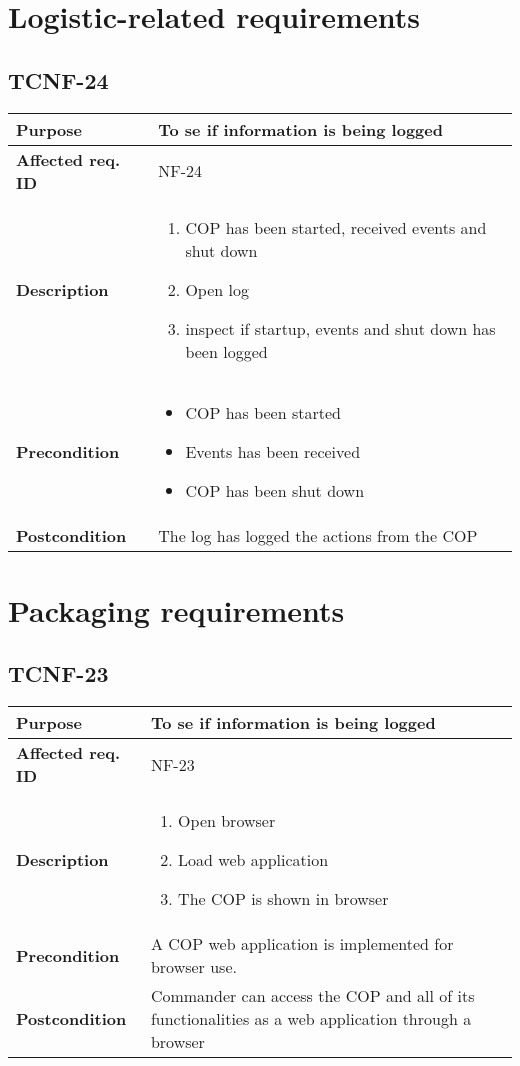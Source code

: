 \section{Logistic-related requirements}
\subsection{TCNF-24}
\begin{tabular}{ l | m{11cm}}
	\textbf{Purpose}			& To se if information is being logged  \\ \hline
	\textbf{Affected req. ID}	& NF-24 \\ \hline
	\textbf{Description}		& \begin{enumerate}
		\item COP has been started, received events and shut down \item Open log \item inspect if startup, events and shut down has been logged
		\end{enumerate}\\
		\hline
	\textbf{Precondition}		& \begin{itemize}
			\item COP has been started \item Events has been received \item COP has been shut down
		\end{itemize}\\ \hline
	\textbf{Postcondition}		& The log has logged the actions from the COP\\
\end{tabular}

\section{Packaging requirements}
\subsection{TCNF-23}
\begin{tabular}{ l | m{11cm}}
	\textbf{Purpose}			& To se if information is being logged  \\ \hline
	\textbf{Affected req. ID}	& NF-23 \\ \hline
	\textbf{Description}		& \begin{enumerate}
		\item Open browser \item Load web application \item The COP is shown in browser
	\end{enumerate}\\
	\hline
	\textbf{Precondition}		& A COP web application is implemented for browser use. \\ \hline
	\textbf{Postcondition}		& Commander can access the COP and all of its functionalities as a web application through a browser\\
\end{tabular}
